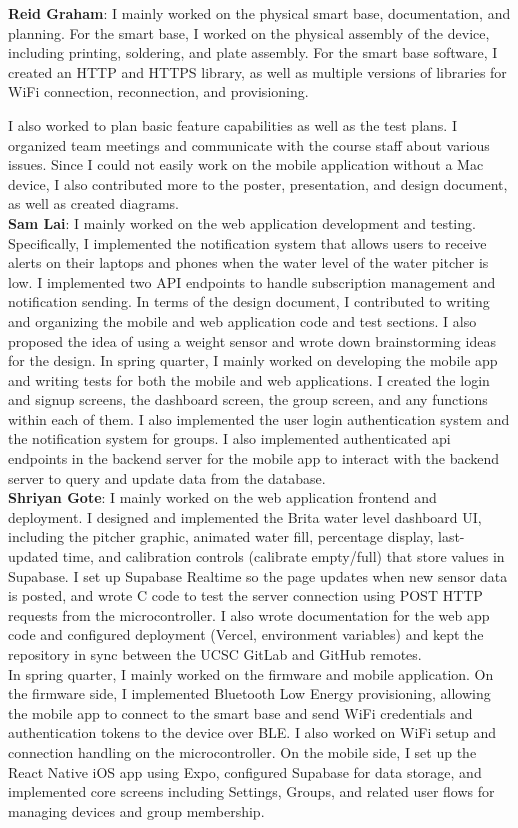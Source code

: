 \noindent\textbf{Reid Graham}:
I mainly worked on the physical smart base, documentation, and planning. For the smart base, I worked on the physical assembly of the device, including printing, soldering, and plate assembly. For the smart base software, I created an HTTP and HTTPS library, as well as multiple versions of libraries for WiFi connection, reconnection, and provisioning.

I also worked to plan basic feature capabilities as well as the test plans. I organized team meetings and communicate with the course staff about various issues. Since I could not easily work on the mobile application without a Mac device, I also contributed more to the poster, presentation, and design document, as well as created diagrams.  \\


\noindent\textbf{Sam Lai}:
I mainly worked on the web application development and testing. Specifically, I implemented the notification system that allows users to receive alerts on their laptops and phones when the water level of the 
water pitcher is low. I implemented two API endpoints to handle subscription management and notification sending. In terms of the design document, I contributed to writing and organizing the mobile and web application code and test sections. I also proposed the idea of using a weight sensor 
and wrote down brainstorming ideas for the design. In spring quarter, I mainly worked on developing the mobile app and writing tests for both the mobile and web applications. I created the login and signup screens, the dashboard screen, the group screen, and any functions within each of them. 
I also implemented the user login authentication system and the notification system for groups. I also implemented authenticated api endpoints in the backend server for the mobile app to interact with the backend server to query and update data from the database. \\

\noindent\textbf{Shriyan Gote}:
I mainly worked on the web application frontend and deployment. I designed and implemented the Brita water level dashboard UI, including the pitcher graphic, animated water fill, percentage display, last-updated time, and calibration controls (calibrate empty/full) that store values in Supabase. I set up Supabase Realtime so the page updates when new sensor data is posted, and wrote C code to test the server connection using POST HTTP requests from the microcontroller. I also wrote documentation for the web app code and configured deployment (Vercel, environment variables) and kept the repository in sync between the UCSC GitLab and GitHub remotes.\\

In spring quarter, I mainly worked on the firmware and mobile application. On the firmware side, I implemented Bluetooth Low Energy provisioning, allowing the mobile app to connect to the smart base and send WiFi credentials and authentication tokens to the device over BLE. I also worked on WiFi setup and connection handling on the microcontroller. On the mobile side, I set up the React Native iOS app using Expo, configured Supabase for data storage, and implemented core screens including Settings, Groups, and related user flows for managing devices and group membership.